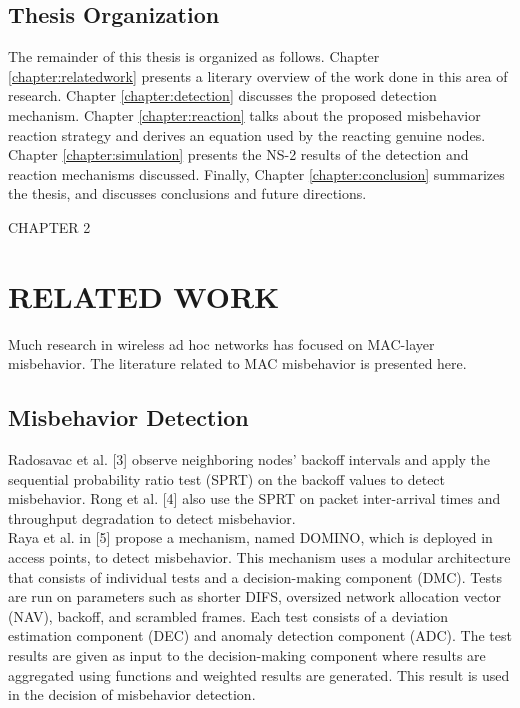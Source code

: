 \documentclass[12pt,letterpaper,english]{article}
\begin{document}
\subsection{Thesis Organization}
\indent The remainder of this thesis is organized as follows. Chapter \ref{chapter:relatedwork} presents a literary overview of the work done in this area of research. Chapter \ref{chapter:detection} discusses the proposed detection mechanism. Chapter \ref{chapter:reaction} talks about the proposed misbehavior reaction strategy and derives an equation used by the reacting genuine nodes. Chapter \ref{chapter:simulation} presents the NS-2 results of the detection and reaction mechanisms discussed. Finally, Chapter \ref{chapter:conclusion} summarizes the thesis, and discusses conclusions and future directions.
\newpage
\setcounter{table}{0}
\setcounter{figure}{0}
\setcounter{subsection}{0}
\begin{singlespace}
\begin{center}
CHAPTER 2
\section*{RELATED WORK}
\addtocounter{section}{1}
\label{chapter:relatedwork}
\end{center}
\end{singlespace}
\indent Much research in wireless ad hoc networks has focused on MAC-layer misbehavior. The literature related to MAC misbehavior is presented here.
\subsection{Misbehavior Detection}
\indent Radosavac et al. 
[3] 
observe neighboring nodes' backoff intervals and apply the sequential probability ratio test (SPRT) on the backoff values to detect misbehavior. 
Rong et al. 
[4] 
also use the SPRT on packet inter-arrival times and throughput degradation to detect misbehavior.
\\
\indent Raya et al. in 
[5] 
propose a mechanism, named DOMINO, which is deployed in access points, to detect misbehavior. This mechanism uses a modular architecture that consists of individual tests and a decision-making component (DMC). Tests are run on parameters such as shorter DIFS, oversized network allocation vector (NAV), backoff, and scrambled frames. Each test consists of a deviation estimation component (DEC) and anomaly detection component (ADC). The test results are given as input to the decision-making component where results are aggregated using functions and weighted results are generated. This result is used in the decision of misbehavior detection.
\end{document}
